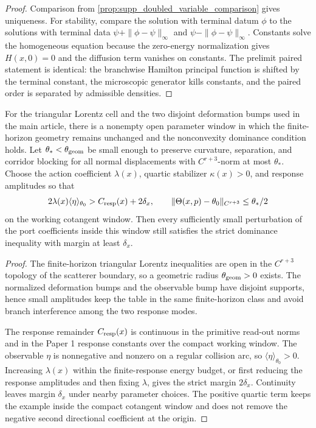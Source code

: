 \begin{proof}
Comparison from \cref{prop:supp_doubled_variable_comparison} gives uniqueness.
For stability, compare the solution with terminal datum \(\phi\) to the
solutions with terminal data \(\psi+\|\phi-\psi\|_\infty\) and
\(\psi-\|\phi-\psi\|_\infty\).  Constants solve the homogeneous equation
because the zero-energy normalization gives \(H(x,0)=0\) and the diffusion term
vanishes on constants.  The prelimit paired statement is identical: the
branchwise Hamilton principal function is shifted by the terminal constant,
the microscopic generator kills constants, and the paired order is separated
by admissible densities.
\end{proof}

\begin{proposition}
\label{prop:supp_concrete_parameter_window}
For the triangular Lorentz cell and the two disjoint deformation bumps used in
the main article, there is a nonempty open parameter window in which the
finite-horizon geometry remains unchanged and the nonconvexity dominance
condition holds.  Let \(\theta_*<\theta_{\rm geom}\) be small enough to
preserve curvature, separation, and corridor blocking for all normal
displacements with \(C^{r+3}\)-norm at most \(\theta_*\).  Choose the action
coefficient \(\lambda(x)\), quartic stabilizer \(\kappa(x)>0\), and response
amplitudes so that
\[
  2\lambda(x)\langle\eta\rangle_{\theta_0}
  >
  C_{\rm resp}(x)+2\delta_x,
  \qquad
  \|\Theta(x,p)-\theta_0\|_{C^{r+3}}\le \theta_*/2
\]
on the working cotangent window.  Then every sufficiently small perturbation
of the port coefficients inside this window still satisfies the strict
dominance inequality with margin at least \(\delta_x\).
\end{proposition}

\begin{proof}
The finite-horizon triangular Lorentz inequalities are open in the
\(C^{r+3}\) topology of the scatterer boundary, so a geometric radius
\(\theta_{\rm geom}>0\) exists.  The normalized deformation bumps and the
observable bump have disjoint supports, hence small amplitudes keep the table
in the same finite-horizon class and avoid branch interference among the two
response modes.

The response remainder \(C_{\rm resp}(x)\) is continuous in the primitive
read-out norms and in the Paper 1 response constants over the compact working
window.  The observable \(\eta\) is nonnegative and nonzero on a regular
collision arc, so \(\langle\eta\rangle_{\theta_0}>0\).  Increasing
\(\lambda(x)\) within the finite-response energy budget, or first reducing the
response amplitudes and then fixing \(\lambda\), gives the strict margin
\(2\delta_x\).  Continuity leaves margin \(\delta_x\) under nearby parameter
choices.  The positive quartic term keeps the example inside the compact
cotangent window and does not remove the negative second directional
coefficient at the origin.
\end{proof}

